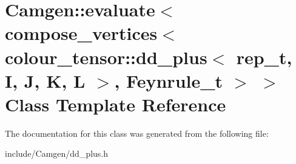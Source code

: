 \hypertarget{a00167}{\section{Camgen\-:\-:evaluate$<$ compose\-\_\-vertices$<$ colour\-\_\-tensor\-:\-:dd\-\_\-plus$<$ rep\-\_\-t, I, J, K, L $>$, Feynrule\-\_\-t $>$ $>$ Class Template Reference}
\label{a00167}
}


The documentation for this class was generated from the following file\-:\begin{DoxyCompactItemize}
\item 
include/\-Camgen/dd\-\_\-plus.\-h\end{DoxyCompactItemize}
